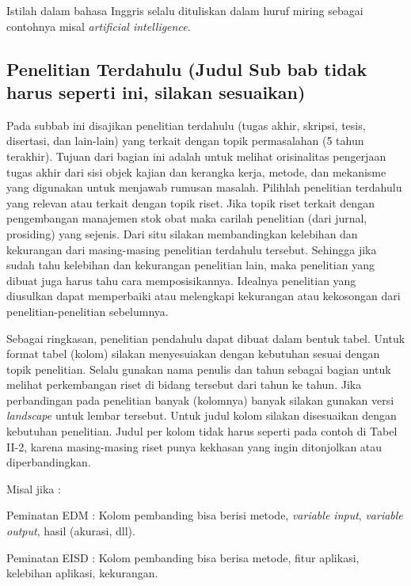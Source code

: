 Istilah dalam bahasa Inggris selalu dituliskan dalam huruf miring
sebagai contohnya misal \emph{artificial intelligence.}

\hypertarget{penelitian-terdahulu-judul-sub-bab-tidak-harus-seperti-ini-silakan-sesuaikan}{%
\subsection{Penelitian Terdahulu (Judul Sub bab tidak harus seperti ini,
silakan
sesuaikan)}\label{penelitian-terdahulu-judul-sub-bab-tidak-harus-seperti-ini-silakan-sesuaikan}}

Pada subbab ini disajikan penelitian terdahulu (tugas akhir, skripsi,
tesis, disertasi, dan lain-lain) yang terkait dengan topik permasalahan
(5 tahun terakhir). Tujuan dari bagian ini adalah untuk melihat
orisinalitas pengerjaan tugas akhir dari sisi objek kajian dan kerangka
kerja, metode, dan mekanisme yang digunakan untuk menjawab rumusan
masalah. Pilihlah penelitian terdahulu yang relevan atau terkait dengan
topik riset. Jika topik riset terkait dengan pengembangan manajemen stok
obat maka carilah penelitian (dari jurnal, prosiding) yang sejenis. Dari
situ silakan membandingkan kelebihan dan kekurangan dari masing-masing
penelitian terdahulu tersebut. Sehingga jika sudah tahu kelebihan dan
kekurangan penelitian lain, maka penelitian yang dibuat juga harus tahu
cara memposisikannya. Idealnya penelitian yang diusulkan dapat
memperbaiki atau melengkapi kekurangan atau kekosongan dari
penelitian-penelitian sebelumnya.

Sebagai ringkasan, penelitian pendahulu dapat dibuat dalam bentuk tabel.
Untuk format tabel (kolom) silakan menyesuiakan dengan kebutuhan sesuai
dengan topik penelitian. Selalu gunakan nama penulis dan tahun sebagai
bagian untuk melihat perkembangan riset di bidang tersebut dari tahun ke
tahun. Jika perbandingan pada penelitian banyak (kolomnya) banyak
silakan gunakan versi \emph{landscape} untuk lembar tersebut. Untuk
judul kolom silakan disesuaikan dengan kebutuhan penelitian. Judul per
kolom tidak harus seperti pada contoh di Tabel II-2, karena
masing-masing riset punya kekhasan yang ingin ditonjolkan atau
diperbandingkan.

Misal jika :

Peminatan EDM : Kolom pembanding bisa berisi metode, \emph{variable
input}, \emph{variable output}, hasil (akurasi, dll).

Peminatan EISD : Kolom pembanding bisa berisa metode, fitur aplikasi,
kelebihan aplikasi, kekurangan.

